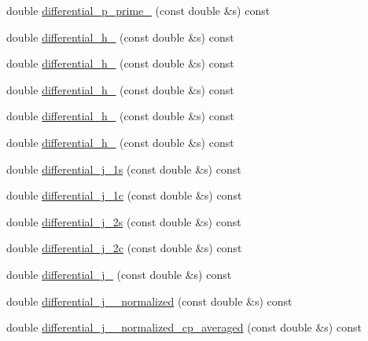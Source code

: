 \begin{DoxyCompactItemize}
\item 
double \hyperlink{classeos_1_1BToKstarDilepton_3_01LargeRecoil_01_4_a942513095cca8276cba277eb998c73f1}{differential\_\-p\_\-prime\_} (const double \&s) const 
\item 
double \hyperlink{classeos_1_1BToKstarDilepton_3_01LargeRecoil_01_4_a3076895ca169ceb6c13b3a0089039bea}{differential\_\-h\_} (const double \&s) const 
\item 
double \hyperlink{classeos_1_1BToKstarDilepton_3_01LargeRecoil_01_4_aabb4dc215ce3f2fc02a3f846eeffda3a}{differential\_\-h\_} (const double \&s) const 
\item 
double \hyperlink{classeos_1_1BToKstarDilepton_3_01LargeRecoil_01_4_a2e7d76876fc033b53061eb733a8d40f8}{differential\_\-h\_} (const double \&s) const 
\item 
double \hyperlink{classeos_1_1BToKstarDilepton_3_01LargeRecoil_01_4_ac60b62a7c500af1d4ae48d23b90ca74b}{differential\_\-h\_} (const double \&s) const 
\item 
double \hyperlink{classeos_1_1BToKstarDilepton_3_01LargeRecoil_01_4_a7ffc985d5f3595a93fa36fd24cc3d43a}{differential\_\-h\_} (const double \&s) const 
\item 
double \hyperlink{classeos_1_1BToKstarDilepton_3_01LargeRecoil_01_4_a254ef49011afd022304b3f1cc75c98e3}{differential\_\-j\_\-1s} (const double \&s) const 
\item 
double \hyperlink{classeos_1_1BToKstarDilepton_3_01LargeRecoil_01_4_adbf8cf75ff92eaab4a76ed7c4250f03a}{differential\_\-j\_\-1c} (const double \&s) const 
\item 
double \hyperlink{classeos_1_1BToKstarDilepton_3_01LargeRecoil_01_4_abe744b897bfadbe4a56de9cfd11b78dd}{differential\_\-j\_\-2s} (const double \&s) const 
\item 
double \hyperlink{classeos_1_1BToKstarDilepton_3_01LargeRecoil_01_4_a477cbfe790f9386ddb96b7c6ac1109a8}{differential\_\-j\_\-2c} (const double \&s) const 
\item 
double \hyperlink{classeos_1_1BToKstarDilepton_3_01LargeRecoil_01_4_ab6aed85bcab71741d2a52db8bae6ff95}{differential\_\-j\_} (const double \&s) const 
\item 
double \hyperlink{classeos_1_1BToKstarDilepton_3_01LargeRecoil_01_4_a17d1b20c2e3b71e473aa5465cc665bb9}{differential\_\-j\_\_\-normalized} (const double \&s) const 
\item 
double \hyperlink{classeos_1_1BToKstarDilepton_3_01LargeRecoil_01_4_a37075144ad0cecd180ec1c48aa3eb68a}{differential\_\-j\_\_\-normalized\_\-cp\_\-averaged} (const double \&s) const 

\end{DoxyCompactItemize}
